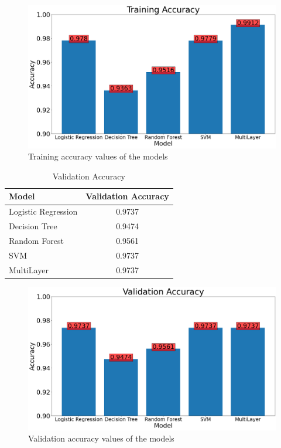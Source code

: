 \documentclass[10pt,twocolumn,letterpaper]{article}
\begin{document}
\begin{figure}
    \centering
    \includegraphics[width=\linewidth, height=\textheight,keepaspectratio]{Images/output2.png}
    \caption{Training accuracy values of the models}
    \label{fig:my_label}
\end{figure}

\begin{table}
  \centering
  \begin{tabular}{@{}lc@{}}
    \toprule
    Model & Validation Accuracy \\
    \midrule
    Logistic Regression & 0.9737 \\
    Decision Tree & 0.9474 \\
    Random Forest & 0.9561 \\
    SVM & 0.9737 \\
    MultiLayer & 0.9737 \\
    \bottomrule
  \end{tabular}
  \caption{Validation Accuracy}
  \label{tab:example}
\end{table}

\begin{figure}
    \centering
    \includegraphics[width=\linewidth, height=\textheight,keepaspectratio]{Images/output3.png}
    \caption{Validation accuracy values of the models}
    \label{fig:my_label}
\end{figure}
\end{document}
